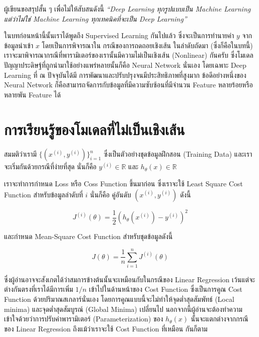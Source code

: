 ผู้เขียนขอสรุปสั้น ๆ เพื่อไม่ให้สับสนดังนี้ \textit{\enquote{Deep Learning ทุกรูปแบบเป็น Machine Learning แต่ว่าไม่ใช่ Machine 
Learning ทุกเทคนิคที่จะเป็น Deep Learning}}

ในบทก่อนหน้านี้นั้นเราได้พูดถึง Supervised Learning กันไปแล้ว ซึ่งจะเป็นการทำนายค่า $y$ จากข้อมูลนำเข้า $x$ โดยเป็นการพิจารณาใน%
กรณีของการถดถอยเชิงเส้น ในลำดับถัดมา (ซึ่งก็คือในบทนี้) เราจะมาพิจารณากรณีที่พารามิเตอร์ของเรานั้นมีความไม่เป็นเชิงเส้น (Nonlinear) 
กันครับ ซึ่งโมเดลปัญญาประดิษฐ์ที่ถูกนำมาใช้อย่างแพร่หลายนั้นก็คือ Neural Network นั่นเอง โดยเฉพาะ Deep Learning ที่ ณ ปัจจุบันได้มี%
การพัฒนาและปรับปรุงจนมีประสิทธิภาพที่สูงมาก ข้อดีอย่างหนึ่งของ Neural Network ก็คือสามารถจัดการกับข้อมูลที่มีความซับซ้อนที่มีจำนวน 
Feature หลายร้อยหรือหลายพัน Feature ได้

\section{การเรียนรู้ของโมเดลที่ไม่เป็นเชิงเส้น}
\label{sec:nonlinear_ml}

สมมติว่าเรามี $\{(x^{(i)}, y^{(i)})\}^n_{i=1}$ ซึ่งเป็นตัวอย่างชุดข้อมูลฝึกสอน (Training Data) และเราจะเริ่มกันด้วยกรณีที่ง่ายที่สุด%
นั่นก็คือ $y^{(i)} \in \mathbb{R}$ และ $h_\theta(x) \in \mathbb{R}$ 

เราจะทำการกำหนด Loss หรือ Coss Function ขึ้นมาก่อน ซึ่งเราจะใช้ Least Square Cost Function สำหรับข้อมูลลำดับที่ $i$ นั่นก็คือ%
คู่อันดับ $(x^{(i)} ,y^{(i)})$ ดังนี้ 

\begin{equation}\label{eq:loss}
    J^{(i)} (\theta) = \frac{1}{2} \left(h_\theta (x^{(i)}) - y^{(i)}\right)^2
\end{equation}

\noindent และกำหนด Mean-Square Cost Function สำหรับชุดข้อมูลดังนี้

\begin{equation}\label{eq:mse_loss}
    J(\theta) = \frac 1 n \sum_{i=1}^n J^{(i)}(\theta)
\end{equation}

\noindent ซึ่งผู้อ่านอาจจะสังเกตได้ว่าสมการข้างต้นนั้นจะเหมือนกับในกรณีของ Linear Regression เว้นแต่จะต่างกันตรงที่เราได้มีการเพิ่ม $1/n$
เข้าไปในด้านหน้าของ Cost Function ซึ่งเป็นการคูณ Cost Function ด้วยปริมาณสเกลาร์นั่นเอง โดยการคูณแบบนี้จะไม่ทำให้จุดต่ำสุดสัมพัทธ์ 
(Local minima) และจุดต่ำสุดสัมบูรณ์ (Global Minima) เปลี่ยนไป นอกจากนี้ผู้อ่านจะต้องทำความเข้าใจด้วยว่าการปรับค่าพารามิเตอร์ 
(Parameterization) ของ $h_\theta(x)$ นั้นจะแตกต่างจากกรณีของ Linear Regression ถึงแม้ว่าเราจะใช้ Cost Function ที่เหมือน%
กันก็ตาม 

